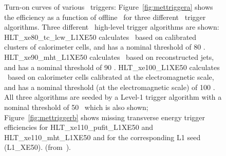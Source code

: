 				\begin{figure}[!htb]
					\centering
					\caption{Turn-on curves of various \met\ triggers: Figure~\ref{fig:mettriggera} shows the efficiency as a function of offline \met\ for three different \met\ trigger algorithms. Three different \met\ high-level trigger algorithms are shown: HLT\_xe80\_tc\_lcw\_L1XE50 calculates \met\ based on calibrated clusters of calorimeter cells, and has a nominal threshold of 80 \GeV. HLT\_xe90\_mht\_L1XE50 calculates \met\ based on reconstructed jets, and has a nominal threshold of 90 \GeV. HLT\_xe100\_L1XE50 calculates \met\ based on calorimeter cells calibrated at the electromagnetic scale, and has a nominal threshold (at the electromagnetic scale) of 100 \GeV. All three algorithms are seeded by a Level-1 trigger algorithm with a nominal threshold of 50 \GeV\ which is also shown; Figure~\ref{fig:mettriggerb} shows missing transverse energy trigger efficiencies for HLT\_xe110\_pufit\_L1XE50 and HLT\_xe110\_mht\_L1XE50 and for the corresponding \ac{L1} seed (L1\_XE50). (from~\cite{ATLASMETTriggerPublicPage}).}
					\label{fig:mettrigger}
				\end{figure}
